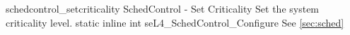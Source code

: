 %
%
%
%

\apidoc
{schedcontrol_setcriticality}
{SchedControl - Set Criticality}
{Set the system criticality level.}
{static inline int seL4\_SchedControl\_Configure }
{
}
{\errorenumdesc}
{See \autoref{sec:sched}}
